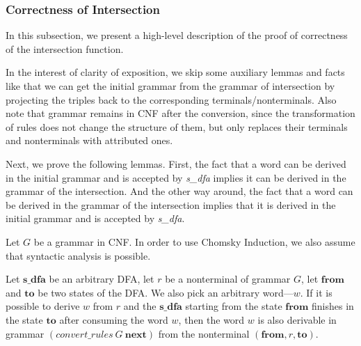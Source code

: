 \subsubsection{Correctness of Intersection}
\label{sec:correctintersection}

In this subsection, we present a high-level description of the proof of correctness of the intersection function.

In the interest of clarity of exposition, we skip some auxiliary lemmas and facts like that we can get the initial grammar from the grammar of intersection by projecting the triples back to the corresponding terminals/nonterminals. Also note that grammar remains in CNF after the conversion, since the transformation of rules does not change the structure of them, but only replaces their terminals and nonterminals with attributed ones.

Next, we prove the following lemmas. First, the fact that a word can be derived in the initial grammar and is accepted by \textit{s\_dfa} implies it can be derived in the grammar of the intersection. And the other way around, the fact that a word can be derived in the grammar of the intersection implies that it is derived in the initial grammar and is accepted by \textit{s\_dfa}.

Let $G$ be a grammar in CNF. In order to use Chomsky Induction, we also assume that syntactic analysis is possible.

\begin{theorem}
    Let $ \boldsymbol{s\_dfa} $ be an arbitrary DFA, let $r$ be a nonterminal of grammar $G$, let $ \boldsymbol{from} $ and $ \boldsymbol{to} $ be two states of the DFA. We also pick an arbitrary word---$w$. If it is possible to derive $w$ from $r$ and the $ \boldsymbol{s\_dfa} $ starting from the state $ \boldsymbol{from} $ finishes in the state $ \boldsymbol{to} $ after consuming the word $w$, then the word $w$ is also derivable in grammar 
    $ (convert\_rules ~ G ~ \boldsymbol{next}) $ from the nonterminal $(\boldsymbol{from}, r, \boldsymbol{to})$.
\end{theorem}

